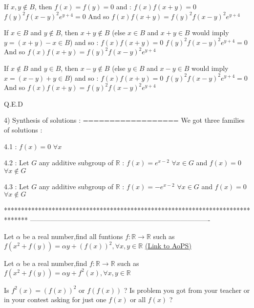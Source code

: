 \begin{solution}
If $x,y\notin B$, then $f(x)=f(y)=0$ and :
$f(x)f(x+y)=0$
$f(y)^2f(x-y)^2e^{y+4}=0$
And so $f(x)f(x+y)=f(y)^2f(x-y)^2e^{y+4}$

If $x\in B$ and $y\notin B$, then $x+y\notin B$ (else $x\in B$ and $x+y\in B$ would imply $y=(x+y)-x\in B$) and so :
$f(x)f(x+y)=0$
$f(y)^2f(x-y)^2e^{y+4}=0$
And so $f(x)f(x+y)=f(y)^2f(x-y)^2e^{y+4}$

If $x\notin B$ and $y\in B$, then $x-y\notin B$ (else $y\in B$ and $x-y\in B$ would imply $x=(x-y)+y\in B$) and so :
$f(x)f(x+y)=0$
$f(y)^2f(x-y)^2e^{y+4}=0$
And so $f(x)f(x+y)=f(y)^2f(x-y)^2e^{y+4}$

Q.E.D

4) Synthesis of solutions :
==================
We got three families of solutions :

4.1 : $f(x)=0$ $\forall x$

4.2 : Let $G$ any additive subgroup of $\mathbb R$ : $f(x)=e^{x-2}$ $\forall x\in G$ and $f(x)=0$ $\forall x\notin G$

4.3 : Let $G$ any additive subgroup of $\mathbb R$ : $f(x)=-e^{x-2}$ $\forall x\in G$ and $f(x)=0$ $\forall x\notin G$
\end{solution}
*******************************************************************************
-------------------------------------------------------------------------------

\begin{problem}
	Let $\alpha$ be a real number,find all funtions $f:\mathbb{R}\to\mathbb{R}$  such as 
$f\left(x^2+f\left(y\right)\right)=\alpha y+\left(f\left(x\right)\right)^2,\forall x,y\in\mathbb{R}$
	\flushright \href{https://artofproblemsolving.com/community/c6h488035}{(Link to AoPS)}
\end{problem}



\begin{solution}
	\begin{tcolorbox}Let $\alpha$ be a real number,find $f:\mathbb{R}\to\mathbb{R}$  such as 
$f\left(x^2+f\left(y\right)\right)=\alpha y+f^2\left(x\right),\forall x,y\in\mathbb{R}$\end{tcolorbox}
Is $f^2(x)=(f(x))^2$ or $f(f(x))$ ?
Is problem you got from your teacher or in your contest asking for just one $f(x)$ or all $f(x)$ ?
\end{solution}




